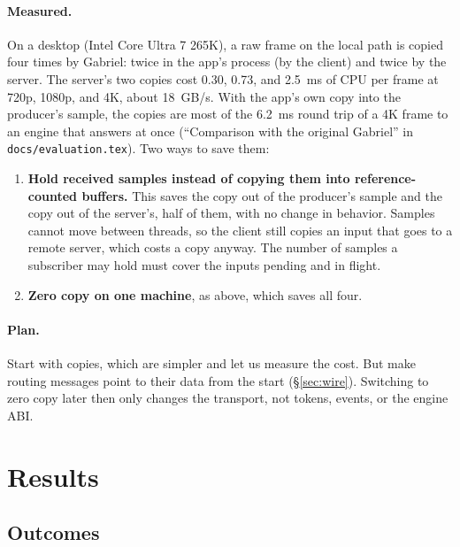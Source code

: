 \documentclass[11pt]{article}
\newcommand{\code}[1]{\texttt{#1}}
\begin{document}
\paragraph{Measured.} On a desktop (Intel Core Ultra 7 265K), a raw frame on
the local path is copied four times by Gabriel: twice in the app's process
(by the client) and twice by the server. The server's two copies cost 0.30,
0.73, and 2.5~ms of CPU per frame at 720p, 1080p, and 4K, about 18~GB/s. With
the app's own copy into the producer's sample, the copies are most of the
6.2~ms round trip of a 4K frame to an engine that answers at once
(``Comparison with the original Gabriel'' in \code{docs/evaluation.tex}).
Two ways to save them:
\begin{enumerate}[nosep]
  \item \textbf{Hold received samples instead of copying them into
        reference-counted buffers.} This saves the copy out of the producer's
        sample and the copy out of the server's, half of them, with no change
        in behavior. Samples cannot move between threads, so the client still
        copies an input that goes to a remote server, which costs a copy
        anyway. The number of samples a subscriber may hold must cover the
        inputs pending and in flight.
  \item \textbf{Zero copy on one machine}, as above, which saves all four.
\end{enumerate}

\paragraph{Plan.} Start with copies, which are simpler and let us measure the
cost. But make routing messages point to their data from the start
(\S\ref{sec:wire}). Switching to zero copy later then only changes the
transport, not tokens, events, or the engine ABI.

\section{Results}
\label{sec:results}

\subsection{Outcomes}
\end{document}
